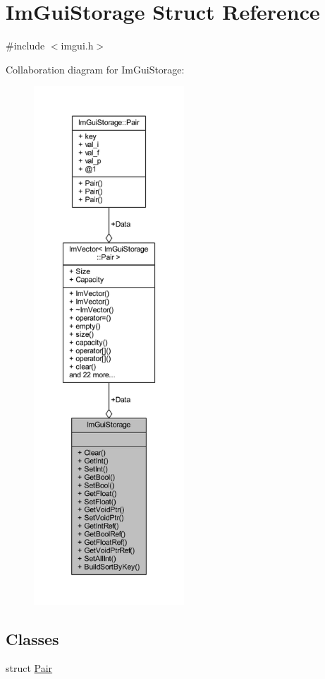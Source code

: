 \hypertarget{struct_im_gui_storage}{}\section{Im\+Gui\+Storage Struct Reference}
\label{struct_im_gui_storage}


{\ttfamily \#include $<$imgui.\+h$>$}



Collaboration diagram for Im\+Gui\+Storage\+:
\nopagebreak
\begin{figure}[H]
\begin{center}
\leavevmode
\includegraphics[height=550pt]{struct_im_gui_storage__coll__graph}
\end{center}
\end{figure}
\subsection*{Classes}
\begin{DoxyCompactItemize}
\item 
struct \mbox{\hyperlink{struct_im_gui_storage_1_1_pair}{Pair}}
\end{DoxyCompactItemize}
